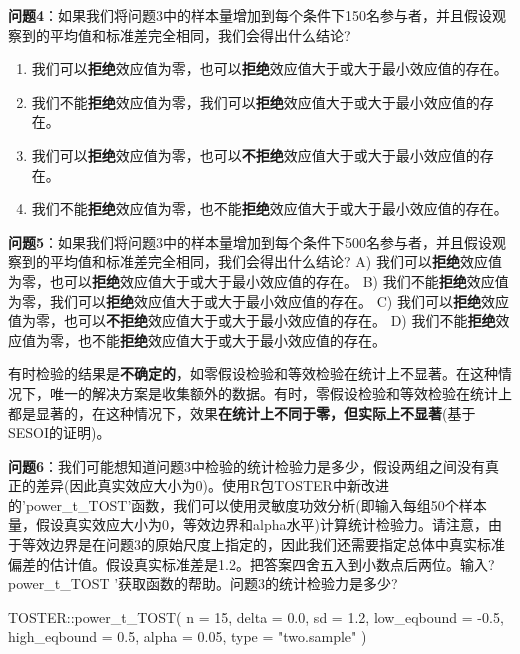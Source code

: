 \documentclass[
  letterpaper,
  DIV=11,
  numbers=noendperiod]{scrreprt}
\newenvironment{Shaded}{\begin{snugshade}}{\end{snugshade}}
\newcommand{\AttributeTok}[1]{\textcolor[rgb]{0.40,0.45,0.13}{#1}}
\newcommand{\DecValTok}[1]{\textcolor[rgb]{0.68,0.00,0.00}{#1}}
\newcommand{\FloatTok}[1]{\textcolor[rgb]{0.68,0.00,0.00}{#1}}
\newcommand{\FunctionTok}[1]{\textcolor[rgb]{0.28,0.35,0.67}{#1}}
\newcommand{\NormalTok}[1]{\textcolor[rgb]{0.00,0.23,0.31}{#1}}
\newcommand{\SpecialCharTok}[1]{\textcolor[rgb]{0.37,0.37,0.37}{#1}}
\newcommand{\StringTok}[1]{\textcolor[rgb]{0.13,0.47,0.30}{#1}}
\providecommand{\tightlist}{%
  \setlength{\itemsep}{0pt}\setlength{\parskip}{0pt}}\usepackage{longtable,booktabs,array}
\begin{document}
\textbf{问题4}：如果我们将问题3中的样本量增加到每个条件下150名参与者，并且假设观察到的平均值和标准差完全相同，我们会得出什么结论?

\begin{enumerate}
\def\labelenumi{\Alph{enumi})}
\tightlist
\item
  我们可以\textbf{拒绝}效应值为零，也可以\textbf{拒绝}效应值大于或大于最小效应值的存在。
\item
  我们不能\textbf{拒绝}效应值为零，我们可以\textbf{拒绝}效应值大于或大于最小效应值的存在。
\item
  我们可以\textbf{拒绝}效应值为零，也可以\textbf{不拒绝}效应值大于或大于最小效应值的存在。
\item
  我们不能\textbf{拒绝}效应值为零，也不能\textbf{拒绝}效应值大于或大于最小效应值的存在。
\end{enumerate}

\textbf{问题5}：如果我们将问题3中的样本量增加到每个条件下500名参与者，并且假设观察到的平均值和标准差完全相同，我们会得出什么结论?
A)
我们可以\textbf{拒绝}效应值为零，也可以\textbf{拒绝}效应值大于或大于最小效应值的存在。
B)
我们不能\textbf{拒绝}效应值为零，我们可以\textbf{拒绝}效应值大于或大于最小效应值的存在。
C)
我们可以\textbf{拒绝}效应值为零，也可以\textbf{不拒绝}效应值大于或大于最小效应值的存在。
D)
我们不能\textbf{拒绝}效应值为零，也不能\textbf{拒绝}效应值大于或大于最小效应值的存在。

有时检验的结果是\textbf{不确定的}，如零假设检验和等效检验在统计上不显著。在这种情况下，唯一的解决方案是收集额外的数据。有时，零假设检验和等效检验在统计上都是显著的，在这种情况下，效果\textbf{在统计上不同于零，但实际上不显著}(基于SESOI的证明)。

\textbf{问题6}：我们可能想知道问题3中检验的统计检验力是多少，假设两组之间没有真正的差异(因此真实效应大小为0)。使用R包TOSTER中新改进的'power\_t\_TOST'函数，我们可以使用灵敏度功效分析(即输入每组50个样本量，假设真实效应大小为0，等效边界和alpha水平)计算统计检验力。请注意，由于等效边界是在问题3的原始尺度上指定的，因此我们还需要指定总体中真实标准偏差的估计值。假设真实标准差是1.2。把答案四舍五入到小数点后两位。输入?power\_t\_TOST
'获取函数的帮助。问题3的统计检验力是多少?

\begin{Shaded}
\begin{Highlighting}[]
\NormalTok{TOSTER}\SpecialCharTok{::}\FunctionTok{power\_t\_TOST}\NormalTok{(}
  \AttributeTok{n =} \DecValTok{15}\NormalTok{,}
  \AttributeTok{delta =} \FloatTok{0.0}\NormalTok{,}
  \AttributeTok{sd =} \FloatTok{1.2}\NormalTok{,}
  \AttributeTok{low\_eqbound =} \SpecialCharTok{{-}}\FloatTok{0.5}\NormalTok{,}
  \AttributeTok{high\_eqbound =} \FloatTok{0.5}\NormalTok{,}
  \AttributeTok{alpha =} \FloatTok{0.05}\NormalTok{,}
  \AttributeTok{type =} \StringTok{"two.sample"}
\NormalTok{)}
\end{Highlighting}
\end{Shaded}
\end{document}
